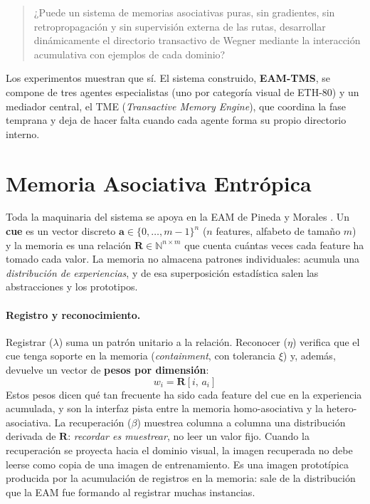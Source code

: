 \documentclass[11pt]{article}
\begin{document}
\begin{quote}
¿Puede un sistema de memorias asociativas puras, sin gradientes, sin
retropropagación y sin supervisión externa de las rutas, desarrollar
dinámicamente el directorio transactivo de Wegner mediante la interacción
acumulativa con ejemplos de cada dominio?
\end{quote}

Los experimentos muestran que sí.
El sistema construido, \textbf{EAM-TMS}, se compone de tres agentes
especialistas (uno por categoría visual de ETH-80) y un mediador central, el
TME (\textit{Transactive Memory Engine}), que coordina la fase temprana y deja
de hacer falta cuando cada agente forma su propio directorio interno.

\section{Memoria Asociativa Entrópica}

Toda la maquinaria del sistema se apoya en la EAM de Pineda y Morales
\cite{pineda2021entropic,pineda2024hetero}.
Un \textbf{cue} es un vector discreto $\mathbf{a} \in \{0,\ldots,m-1\}^n$
($n$ features, alfabeto de tamaño $m$) y la memoria es una relación
$\mathbf{R} \in \mathbb{N}^{n \times m}$ que cuenta cuántas veces cada feature
ha tomado cada valor.
La memoria no almacena patrones individuales: acumula una \emph{distribución de
experiencias}, y de esa superposición estadística salen las abstracciones y los
prototipos.

\paragraph{Registro y reconocimiento.}
Registrar ($\lambda$) suma un patrón unitario a la relación.
Reconocer ($\eta$) verifica que el cue tenga soporte en la memoria
(\emph{containment}, con tolerancia $\xi$) y, además, devuelve un vector de
\textbf{pesos por dimensión}:
\begin{equation}
    w_i = \mathbf{R}[i,\, a_i]
    \label{eq:pesos}
\end{equation}
Estos pesos dicen qué tan frecuente ha sido cada feature del cue en la
experiencia acumulada, y son la interfaz pista entre la memoria homo-asociativa
y la hetero-asociativa.
La recuperación ($\beta$) muestrea columna a columna una distribución derivada
de $\mathbf{R}$: \emph{recordar es muestrear}, no leer un valor fijo.
Cuando la recuperación se proyecta hacia el dominio visual, la imagen recuperada
no debe leerse como copia de una imagen de entrenamiento.
Es una imagen prototípica producida por la acumulación de registros en la memoria:
sale de la distribución que la EAM fue formando al registrar muchas instancias.
\end{document}
